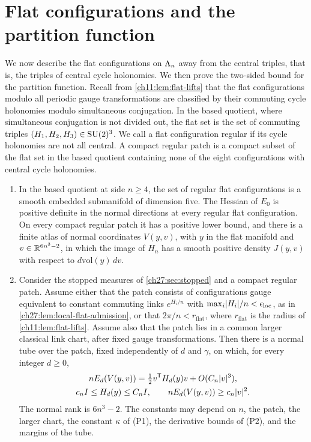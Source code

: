 \section{Flat configurations and the partition function}\label{ch27:sec:normalizer}

We now describe the flat configurations on $\Lambda_{n}$ away from the central triples, that is, the triples of central cycle holonomies. We then prove the two-sided bound for the partition function. Recall from \cref{ch11:lem:flat-lifts} that the flat configurations modulo all periodic gauge transformations are classified by their commuting cycle holonomies modulo simultaneous conjugation. In the based quotient, where simultaneous conjugation is not divided out, the flat set is the set of commuting triples $(H_1,H_2,H_3)\in\mathrm{SU}(2)^3$. We call a flat configuration regular if its cycle holonomies are not all central. A compact regular patch is a compact subset of the flat set in the based quotient containing none of the eight configurations with central cycle holonomies.

\begin{lemma}\label{ch27:lem:regular-flat-tube}
\begin{enumerate}
\item In the based quotient at side $n\ge4$, the set of regular flat configurations is a smooth embedded submanifold of dimension five. The Hessian of $E_0$ is positive definite in the normal directions at every regular flat configuration. On every compact regular patch it has a positive lower bound, and there is a finite atlas of normal coordinates $V(y,v)$, with $y$ in the flat manifold and $v\in\mathbb R^{6n^3-2}$, in which the image of $H_n$ has a smooth positive density $J(y,v)$ with respect to $d\mathrm{vol}(y)\,dv$.
\item Consider the stopped measures of \cref{ch27:sec:stopped} and a compact regular patch. Assume either that the patch consists of configurations gauge equivalent to constant commuting links $e^{H_i/n}$ with $\max_i\lvert H_i\rvert/n<\epsilon_{\mathrm{loc}}$, as in \cref{ch27:lem:local-flat-admission}, or that $2\pi/n<r_{\mathrm{flat}}$, where $r_{\mathrm{flat}}$ is the radius of \cref{ch11:lem:flat-lifts}. Assume also that the patch lies in a common larger classical link chart, after fixed gauge transformations. Then there is a normal tube over the patch, fixed independently of $d$ and $\gamma$, on which, for every integer $d\ge0$,
\begin{gather*}
 nE_d(V(y,v))=\tfrac12v^{\mathsf T}H_d(y)v+O(C_n\lvert v\rvert^3),\\
 c_nI\le H_d(y)\le C_nI,\qquad nE_d(V(y,v))\ge c_n\lvert v\rvert^2.
\end{gather*}
The normal rank is $6n^3-2$. The constants may depend on $n$, the patch, the larger chart, the constant $\kappa$ of (P1), the derivative bounds of (P2), and the margins of the tube.
\end{enumerate}
\end{lemma}

